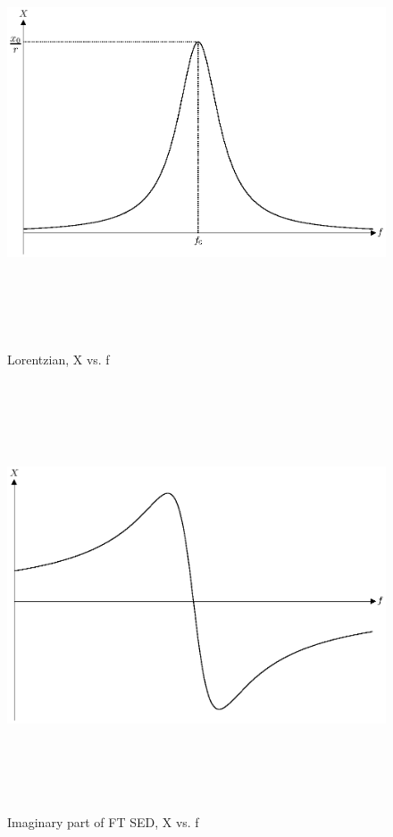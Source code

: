 \documentclass[letterpaper, 11pt]{article}
\numberwithin{equation}{section}
\numberwithin{figure}{section}
\numberwithin{table}{section}
\begin{document}
\begin{figure}[H]
	\centering
	\includegraphics[height=5in]{Lorentzian_R.eps}
	\caption{Lorentzian, X vs. f}
	\label{fig2}
\end{figure}

\begin{figure}[H]
	\centering
	\includegraphics[height=5in]{Lorentzian_L.eps}
	\caption{Imaginary part of FT SED, X vs. f}
	\label{fig3}
\end{figure}
\end{document}
